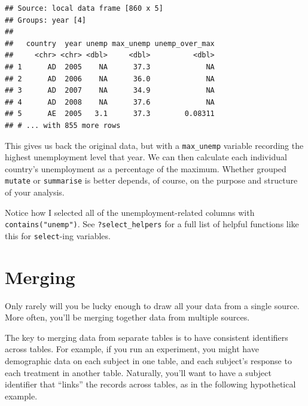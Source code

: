 \documentclass[12pt,oneside,openany]{book}
\newenvironment{Shaded}{\begin{snugshade}}{\end{snugshade}}
\newcommand{\KeywordTok}[1]{\textcolor[rgb]{0.13,0.29,0.53}{\textbf{{#1}}}}
\newcommand{\DataTypeTok}[1]{\textcolor[rgb]{0.13,0.29,0.53}{{#1}}}
\newcommand{\StringTok}[1]{\textcolor[rgb]{0.31,0.60,0.02}{{#1}}}
\newcommand{\OtherTok}[1]{\textcolor[rgb]{0.56,0.35,0.01}{{#1}}}
\newcommand{\NormalTok}[1]{{#1}}
\begin{document}
\begin{Shaded}
\end{Shaded}

\begin{verbatim}
## Source: local data frame [860 x 5]
## Groups: year [4]
## 
##   country  year unemp max_unemp unemp_over_max
##     <chr> <chr> <dbl>     <dbl>          <dbl>
## 1      AD  2005    NA      37.3             NA
## 2      AD  2006    NA      36.0             NA
## 3      AD  2007    NA      34.9             NA
## 4      AD  2008    NA      37.6             NA
## 5      AE  2005   3.1      37.3        0.08311
## # ... with 855 more rows
\end{verbatim}

This gives us back the original data, but with a \texttt{max\_unemp}
variable recording the highest unemployment level that year. We can then
calculate each individual country's unemployment as a percentage of the
maximum. Whether grouped \texttt{mutate} or \texttt{summarise} is better
depends, of course, on the purpose and structure of your analysis.

Notice how I selected all of the unemployment-related columns with
\texttt{contains("unemp")}. See \texttt{?select\_helpers} for a full
list of helpful functions like this for \texttt{select}-ing variables.

\section{Merging}\label{merging}

Only rarely will you be lucky enough to draw all your data from a single
source. More often, you'll be merging together data from multiple
sources.

The key to merging data from separate tables is to have consistent
identifiers across tables. For example, if you run an experiment, you
might have demographic data on each subject in one table, and each
subject's response to each treatment in another table. Naturally, you'll
want to have a subject identifier that ``links'' the records across
tables, as in the following hypothetical example.
\end{document}
